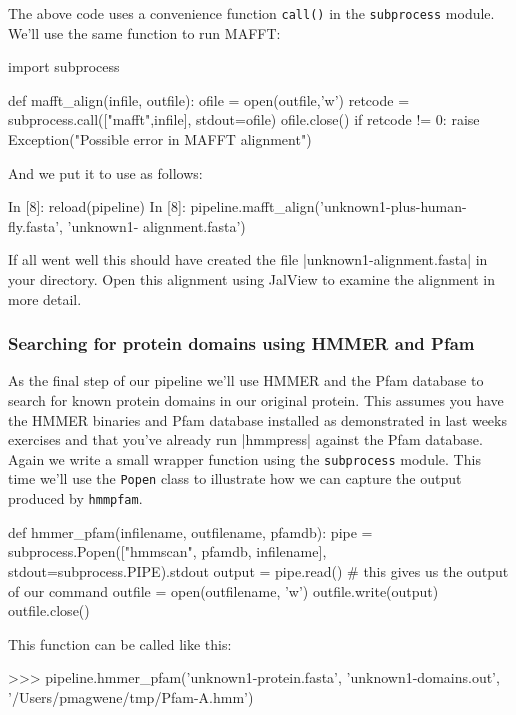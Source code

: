\documentclass[10pt,letterpaper]{scrartcl}
\begin{document}
The above code uses a convenience function \verb=call()= in the \verb=subprocess= module. We'll use the same function to run MAFFT:

\begin{python}
import subprocess

def mafft_align(infile, outfile):
    ofile = open(outfile,'w')
    retcode = subprocess.call(["mafft",infile], stdout=ofile)
    ofile.close()
    if retcode != 0:
        raise Exception("Possible error in MAFFT alignment")    
\end{python}

And we put it to use as follows:
\begin{python}
In [8]: reload(pipeline)
In [8]: pipeline.mafft_align('unknown1-plus-human-fly.fasta', 'unknown1-
alignment.fasta')
\end{python}

If all went well this should have created the file |unknown1-alignment.fasta| in your directory.  Open this alignment using JalView to examine the alignment in more detail.

\subsubsection*{Searching for protein domains using HMMER and Pfam}

As the final step of our pipeline we'll use HMMER and the Pfam database to search for known protein domains in our original protein. This assumes you have the HMMER binaries and Pfam database installed as demonstrated in last weeks exercises and that you've already run |hmmpress| against the Pfam database. Again we write a small wrapper function using the \verb=subprocess= module. This time we'll use the \verb=Popen= class to illustrate how we can capture the output produced by \verb=hmmpfam=. 

\begin{python}
def hmmer_pfam(infilename, outfilename, pfamdb):
    pipe = subprocess.Popen(["hmmscan", pfamdb, infilename], 
            stdout=subprocess.PIPE).stdout
    output = pipe.read() # this gives us the output of our command
    outfile = open(outfilename, 'w')
    outfile.write(output)
    outfile.close()
\end{python}


This function can be called like this:

\begin{python}
>>> pipeline.hmmer_pfam('unknown1-protein.fasta', 'unknown1-domains.out',
 '/Users/pmagwene/tmp/Pfam-A.hmm')
\end{python}
\end{document}
